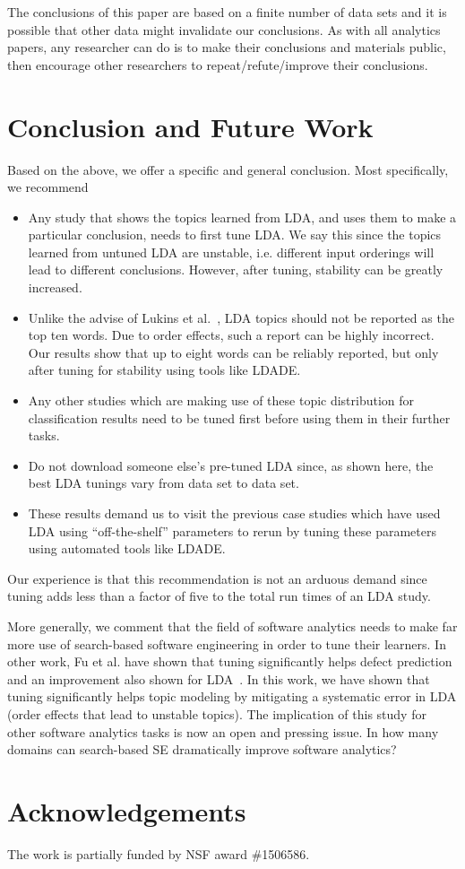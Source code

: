 \documentclass[twocolumn,5p,sort&compress]{elsarticle}
\newcommand{\bi}{\begin{itemize}}
\newcommand{\ei}{\end{itemize}}
\theoremstyle{break}
\begin{document}
The conclusions of this paper are based on a finite number of data sets and it is possible
that other data might invalidate our conclusions. As with all analytics papers, any researcher can do is to make their conclusions and materials public, then encourage
other researchers to repeat/refute/improve their conclusions.

\section{Conclusion and Future Work}

Based on the above, we offer a specific and general conclusion. Most specifically, we recommend 
\bi

\item  
Any study that shows the topics learned from LDA, and uses them to make a particular
conclusion, needs to first tune LDA. We say this since the topics learned from untuned LDA are unstable, i.e. different input orderings will lead to different conclusions. However, after tuning, stability can be greatly increased.
\item Unlike the advise of Lukins et al.~\cite{lukins2010bug}, LDA topics should not be reported as the top ten words.
  Due to order effects, such a report can be highly incorrect.
  Our results show that up to eight words can be reliably reported, but only
  after tuning for stability using tools like LDADE.
 \item Any other studies which are making use of these topic distribution for classification results need to be tuned first before using them in their further tasks.
\item Do not download someone else's pre-tuned LDA since, as shown here,  the best LDA tunings vary from data set to data set.
\item These results demand us to visit the previous case studies which have used LDA using ``off-the-shelf'' parameters to rerun by tuning these parameters using automated tools like LDADE.
    
\ei
Our experience is that this recommendation is not an arduous demand since tuning adds less than a factor of five to the total run times of an LDA study.

More generally, we comment that the field of software analytics needs to make far more use of search-based software engineering in order
to tune their learners. In other work, Fu et al. have shown that tuning significantly helps defect prediction~\cite{fu2016tuning} and an improvement also shown for LDA~\cite{panichella2013effectively}. In this work, we have shown that tuning significantly helps topic modeling by mitigating a systematic error in LDA  (order effects that lead to unstable topics). The implication of this study for other software analytics tasks is now an open
and pressing issue. 
In how many domains can search-based SE dramatically improve software analytics?


\section*{Acknowledgements}
		The work is partially funded by NSF award \#1506586.
	
\balance

\medskip

\end{document}
